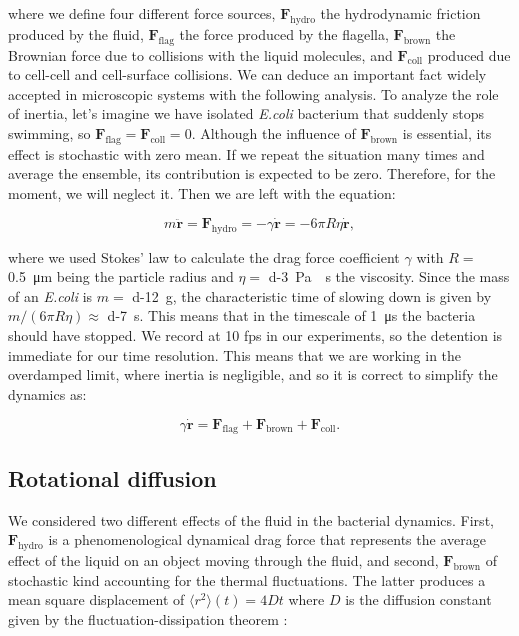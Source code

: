where we define four different force sources, $\textbf{F}_{\text{hydro}}$ the hydrodynamic friction produced by the fluid, $\textbf{F}_{\text{flag}}$ the force produced by the flagella, $\textbf{F}_{\text{brown}}$ the Brownian force due to collisions with the liquid molecules, and $\textbf{F}_{\text{coll}}$ produced due to cell-cell and cell-surface collisions. We can deduce an important fact widely accepted in microscopic systems with the following analysis. To analyze the role of inertia, let's imagine we have isolated \textit{E.coli} bacterium that suddenly stops swimming, so $\textbf{F}_{\text{flag}} = \textbf{F}_{\text{coll}} =0$. Although the influence of $\textbf{F}_{\text{brown}}$ is essential, its effect is stochastic with zero mean. If we repeat the situation many times and average the ensemble, its contribution is expected to be zero. Therefore, for the moment, we will neglect it. Then we are left with the equation:

\begin{equation}
	m\ddot{\textbf{r}} = \textbf{F}_{\text{hydro}} = -\gamma \dot{\textbf{r}} = - 6 \pi R \eta \dot{\textbf{r}},
\end{equation}

where we used Stokes' law to calculate the drag force coefficient $\gamma$ with $R=$ \SI{0.5}{\micro\meter} being the particle radius and $\eta=$ \SI{d-3}{\pascal\cdot\second} the viscosity. Since the mass of an \textit{E.coli} is $m=$ \SI{d-12}{\gram}, the characteristic time of slowing down is given by $ m/(6 \pi R \eta) \approx $ \SI{d-7}{\second}. This means that in the timescale of \SI{1}{\micro\second} the bacteria should have stopped. We record at 10 fps in our experiments, so the detention is immediate for our time resolution. This means that we are working in the overdamped limit, where inertia is negligible, and so it is correct to simplify the dynamics as:

\begin{equation} \label{eq:overdamped_model}
	\gamma \dot{\textbf{r}} = \textbf{F}_{\text{flag}} + \textbf{F}_{\text{brown}} + \textbf{F}_{\text{coll}}.
\end{equation}

\subsection{Rotational diffusion}

We considered two different effects of the fluid in the bacterial dynamics. First, $\textbf{F}_{\text{hydro}}$ is a phenomenological dynamical drag force that represents the average effect of the liquid on an object moving through the fluid, and second, $\textbf{F}_{\text{brown}}$ of stochastic kind accounting for the thermal fluctuations. The latter produces a mean square displacement of $\langle r^2 \rangle (t) = 4 D t $ where $D$ is the diffusion constant given by the fluctuation-dissipation theorem \cite{Soto2016KineticPhenomena}:

